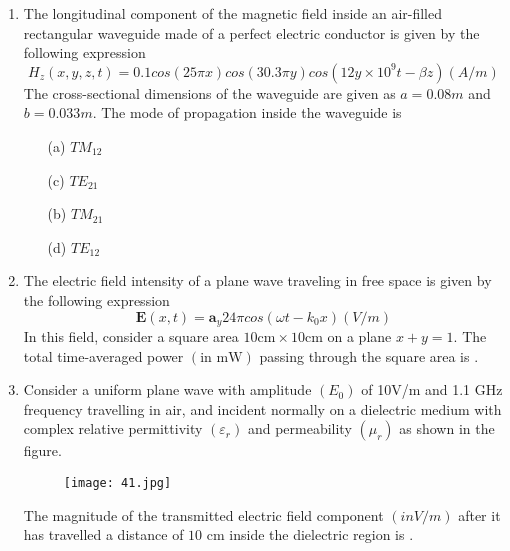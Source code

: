 \documentclass[12pt,-letter paper]{article}
\providecommand{\brak}[1]{\ensuremath{\left(#1\right)}}
\theoremstyle{remark}
\begin{document}
\begin{enumerate}
 \item The longitudinal component of the magnetic field inside an air-filled rectangular waveguide made of a perfect electric conductor is given by the following expression
\[H_z\brak{x,y,z,t}=0.1cos\brak{25\pi x}cos\brak{30.3\pi y}cos\brak{12y\times 10^9t-\beta z}\brak{A/m}\]
The cross-sectional dimensions of the waveguide are given as $a=0.08m$ and $b=0.033m$. The mode of propagation inside the waveguide is
\begin{minipage}[t]{.5\textwidth}
\begin{itemize}
        \item[(a)] $TM_{12}$
        \item[(c)] $TE_{21}$
    \end{itemize}
    \end{minipage}
    \hfill %
    \begin{minipage}[t]{.5\textwidth}
    \begin{itemize}
        \item[(b)] $TM_{21}$
        \item[(d)] $TE_{12}$
    \end{itemize}
    \end{minipage}
 \item The electric field intensity of a plane wave traveling in free space is given by the following expression
    \[\textbf{E}\brak{x,t}=\textbf{a}_y 24\pi cos\brak{\omega t-k_0x}\brak{V/m}\] In this field, consider a square area $10\text{cm}\times 10\text{cm}$ on a plane $x+y=1$. The total time-averaged power \brak{\text{in mW}} passing through the square area is \underline{\hspace{1cm}}.
 \item Consider a uniform plane wave with amplitude $\brak{E_0}$ of 10V/m and 1.1 GHz  frequency travelling in air, and incident normally on a dielectric medium with complex relative permittivity $\brak{\varepsilon_r}$ and permeability $\brak{\mu_r}$ as shown in the figure.
    \begin{figure}[H]
        \centering
        \texttt{[image: 41.jpg]}
    \end{figure} The magnitude of the transmitted electric field component \brak{in V/m} after it has travelled a distance 
of $10$ cm inside the dielectric region is \underline{\hspace{2cm}}.
    
\end{enumerate}
\end{document}

